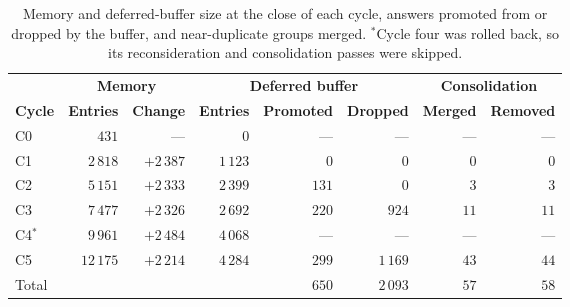 \begin{table}[!htbp]
\centering\small
\setlength{\tabcolsep}{4pt}
\begin{tabular}{@{}lrrrrrrr@{}}
\toprule
 & \multicolumn{2}{c}{\textbf{Memory}} & \multicolumn{3}{c}{\textbf{Deferred buffer}} & \multicolumn{2}{c}{\textbf{Consolidation}} \\
\cmidrule(lr){2-3}\cmidrule(lr){4-6}\cmidrule(lr){7-8}
\textbf{Cycle} & \textbf{Entries} & \textbf{Change} & \textbf{Entries} & \textbf{Promoted} & \textbf{Dropped} & \textbf{Merged} & \textbf{Removed} \\
\midrule
C0 & $431$ & --- & $0$ & --- & --- & --- & --- \\
C1 & $2\,818$ & $+2\,387$ & $1\,123$ & $0$ & $0$ & $0$ & $0$ \\
C2 & $5\,151$ & $+2\,333$ & $2\,399$ & $131$ & $0$ & $3$ & $3$ \\
C3 & $7\,477$ & $+2\,326$ & $2\,692$ & $220$ & $924$ & $11$ & $11$ \\
C4$^{\ast}$ & $9\,961$ & $+2\,484$ & $4\,068$ & --- & --- & --- & --- \\
C5 & $12\,175$ & $+2\,214$ & $4\,284$ & $299$ & $1\,169$ & $43$ & $44$ \\
\midrule
Total & & & & $650$ & $2\,093$ & $57$ & $58$ \\
\bottomrule
\end{tabular}
\caption[Memory, deferred buffer and consolidation by cycle.]{Memory and deferred-buffer size at the close of each cycle, answers promoted from or dropped by the buffer, and near-duplicate groups merged. $^{\ast}$Cycle four was rolled back, so its reconsideration and consolidation passes were skipped.}
\label{tab:memory-store-trajectory}
\end{table}
